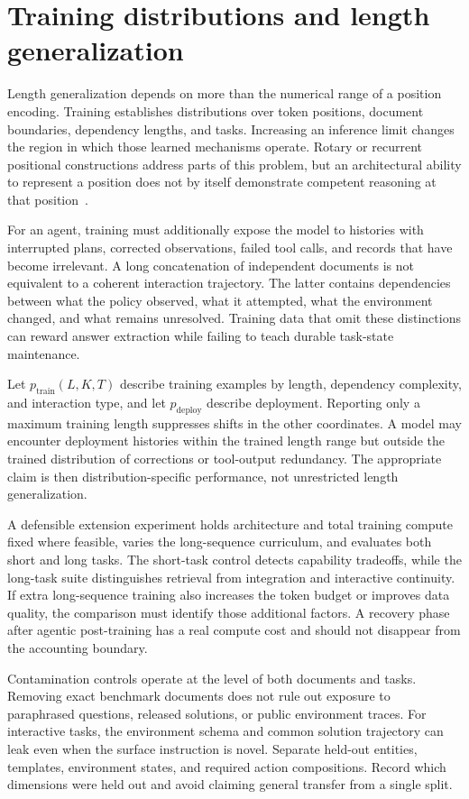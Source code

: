 \section{Training distributions and length generalization}\label{sec:C11:training}
Length generalization depends on more than the numerical range of a position encoding. Training establishes distributions over token positions, document boundaries, dependency lengths, and tasks. Increasing an inference limit changes the region in which those learned mechanisms operate. Rotary or recurrent positional constructions address parts of this problem, but an architectural ability to represent a position does not by itself demonstrate competent reasoning at that position~\cite{su2021roformer,dai2019transformerxl}.

For an agent, training must additionally expose the model to histories with interrupted plans, corrected observations, failed tool calls, and records that have become irrelevant. A long concatenation of independent documents is not equivalent to a coherent interaction trajectory. The latter contains dependencies between what the policy observed, what it attempted, what the environment changed, and what remains unresolved. Training data that omit these distinctions can reward answer extraction while failing to teach durable task-state maintenance.

Let $p_{\mathrm{train}}(L,K,T)$ describe training examples by length, dependency complexity, and interaction type, and let $p_{\mathrm{deploy}}$ describe deployment. Reporting only a maximum training length suppresses shifts in the other coordinates. A model may encounter deployment histories within the trained length range but outside the trained distribution of corrections or tool-output redundancy. The appropriate claim is then distribution-specific performance, not unrestricted length generalization.

A defensible extension experiment holds architecture and total training compute fixed where feasible, varies the long-sequence curriculum, and evaluates both short and long tasks. The short-task control detects capability tradeoffs, while the long-task suite distinguishes retrieval from integration and interactive continuity. If extra long-sequence training also increases the token budget or improves data quality, the comparison must identify those additional factors. A recovery phase after agentic post-training has a real compute cost and should not disappear from the accounting boundary.

Contamination controls operate at the level of both documents and tasks. Removing exact benchmark documents does not rule out exposure to paraphrased questions, released solutions, or public environment traces. For interactive tasks, the environment schema and common solution trajectory can leak even when the surface instruction is novel. Separate held-out entities, templates, environment states, and required action compositions. Record which dimensions were held out and avoid claiming general transfer from a single split.

